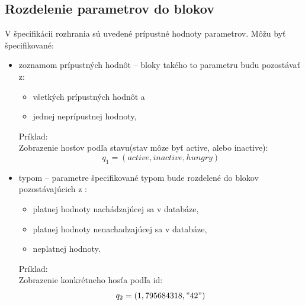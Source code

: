\subsection*{Rozdelenie parametrov do blokov}
V špecifikácii rozhrania sú uvedené prípustné hodnoty parametrov.
Môžu byť špecifikované:
\begin{itemize}
	\item zoznamom prípustných hodnôt -- bloky takého to parametru budu pozostávať z:
		\begin{itemize}
			\item všetkých prípustných hodnôt a 
			\item jednej neprípustnej hodnoty,
		\end{itemize}
		Príklad: \\
		Zobrazenie hosťov podľa stavu(stav môze byť active, alebo inactive):
		\begin{equation}
			q_1 = (active, inactive, hungry)
		\end{equation}
	\item typom -- parametre špecifikované typom bude rozdelené do blokov pozostávajúcich z :
		\begin{itemize}
			\item platnej hodnoty nachádzajúcej sa v databáze,
			\item platnej hodnoty nenachadzajúcej sa v databáze,
			\item neplatnej hodnoty.
		\end{itemize}
		Príklad: \\
		Zobrazenie konkrétneho hosťa podľa id:
		\begin{equation}
			q_2 = (1, 795684318, "42")
		\end{equation}
\end{itemize}
